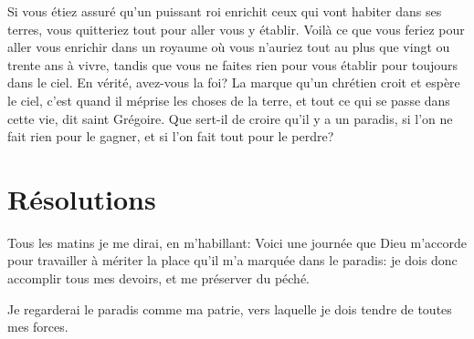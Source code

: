 \documentclass[instructions.tex]{subfiles}
\begin{document}
Si vous étiez assuré qu’un puissant roi enrichit ceux qui vont habiter dans ses terres, vous quitteriez tout pour aller vous y établir. Voilà ce que vous feriez pour aller vous enrichir dans un royaume où vous n’auriez tout au plus que vingt ou trente ans à vivre, tandis que vous ne faites rien pour vous établir pour toujours dans le ciel. En vérité, avez-vous la foi? La marque qu’un chrétien croit et espère le ciel, c’est quand il méprise les choses de la terre, et tout ce qui se passe dans cette vie, dit saint Grégoire. Que sert-il de croire qu’il y a un paradis, si l’on ne fait rien pour le gagner, et si l’on fait tout pour le perdre?
 
\section{Résolutions}
 
\primo Tous les matins je me dirai, en m’habillant: Voici une journée que Dieu m’accorde pour travailler à mériter la place qu’il m’a marquée dans le paradis: je dois donc accomplir tous mes devoirs, et me préserver du péché.
 
\secundo Je regarderai le paradis comme ma patrie, vers laquelle je dois tendre de toutes mes forces.
 
 
\end{document}
